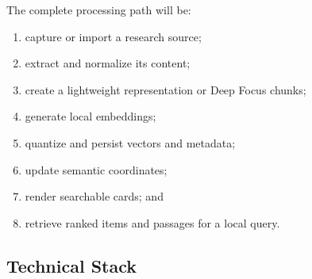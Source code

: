 \documentclass{tietreport}
\begin{document}
The complete processing path will be:

\begin{enumerate}
  \item capture or import a research source;
  \item extract and normalize its content;
  \item create a lightweight representation or Deep Focus chunks;
  \item generate local embeddings;
  \item quantize and persist vectors and metadata;
  \item update semantic coordinates;
  \item render searchable cards; and
  \item retrieve ranked items and passages for a local query.
\end{enumerate}

\subsection{Technical Stack}
\end{document}
